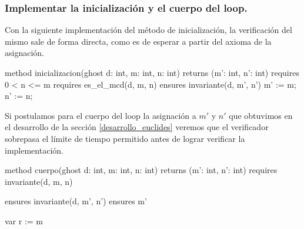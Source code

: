 \documentclass[12pt, a4paper, openany, fleqn]{book}
\begin{document}
\subsubsection{Implementar la inicialización y el cuerpo del loop.}

    Con la siguiente implementación del método de inicialización, la verificación del mismo sale de forma directa, como es de esperar a partir del axioma de la asignación.

    \begin{greenbox}
    \begin{dafny}[gobble=8]
        method inicializacion(ghost d: int, m: int, n: int)
            returns (m': int, n': int)
            requires 0 < n <= m
            requires es_el_mcd(d, m, n)
            ensures invariante(d, m', n')
        {
            m' := m;
            n' := n;
        }
    \end{dafny}
    \end{greenbox}

    Si postulamos para el cuerpo del loop la asignación a $m'$ y $n'$ que obtuvimos en el desarrollo de la sección \ref{desarrollo_euclides} veremos que el verificador sobrepasa el límite de tiempo permitido antes de lograr verificar la implementación.

    \begin{whitebox}[before skip=2ex]
    \begin{dafny}[gobble=8]
        method cuerpo(ghost d: int, m: int, n: int)
            returns (m': int, n': int)
            requires invariante(d, m, n)
    \end{dafny}
    \end{whitebox}
    \begin{redbox}
    \begin{dafny}[gobble=8,firstnumber=4]
            ensures invariante(d, m', n')
            ensures m' %
    \end{dafny}
    \end{redbox}
    \begin{whitebox}
    \begin{dafny}[gobble=8,firstnumber=6]
        {
    \end{dafny}
    \end{whitebox}

    \begin{redbox}
    \begin{dafny}[gobble=8,firstnumber=7]
            var r := m %
    \end{dafny}
    \end{redbox}
\end{document}
